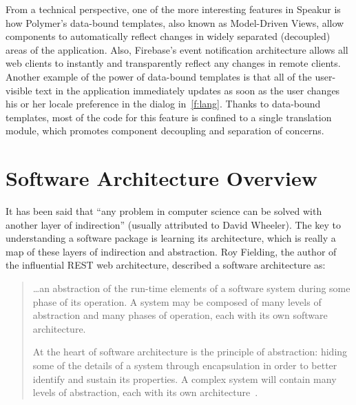 From a technical perspective, one of the more interesting features in Speakur is how Polymer's data-bound templates, also known as Model-Driven Views, 
allow components to automatically reflect changes in widely separated (decoupled) areas of the application.
Also, Firebase's event notification architecture allows all web clients to instantly and transparently reflect any changes in remote clients.
Another example of the power of data-bound templates is that all of the user-visible text in the application immediately updates as soon as the user changes his or her locale preference in the dialog in~\cref{f:lang}.
Thanks to data-bound templates, 
most of the code for this feature is confined to a single translation module, 
which promotes component decoupling and separation of concerns.

\section{Software Architecture Overview}
It has been said that ``any problem in computer science can be solved with another layer of indirection'' (usually attributed to David Wheeler).
The key to understanding a software package is learning its architecture,
which is really a map of these layers of indirection and abstraction.
Roy Fielding, the author of the influential REST web architecture, described a software architecture as:

\begin{quote}
\dots an abstraction of the run-time elements of a software system during some phase of its operation. A system may be composed of many levels of abstraction and many phases of operation, each with its own software architecture.

At the heart of software architecture is the principle of abstraction: hiding some of the details of a system through encapsulation in order to better identify and sustain its properties. A complex system will contain many levels of abstraction, each with its own architecture~\cite{fielding2000}.
\end{quote}

